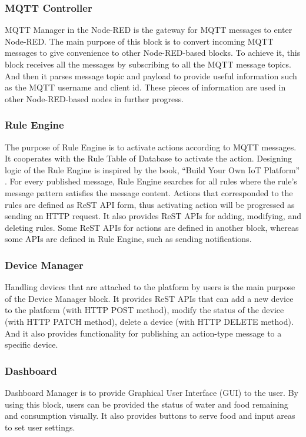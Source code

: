 \documentclass[conference]{IEEEtran}
\begin{document}
\subsubsection{MQTT Controller}
MQTT Manager in the Node-RED is the gateway for MQTT messages to enter Node-RED. The main purpose of this block is to convert incoming MQTT messages to give convenience to other Node-RED-based blocks. To achieve it, this block receives all the messages by subscribing to all the MQTT message topics. And then it parses message topic and payload to provide useful information such as the MQTT username and client id. These pieces of information are used in other Node-RED-based nodes in further progress.

\subsubsection{Rule Engine}
The purpose of Rule Engine is to activate actions according to MQTT messages. It cooperates with the Rule Table of Database to activate the action. Designing logic of the Rule Engine is inspired by the book, “Build Your Own IoT Platform” \cite{b22}. For every published message, Rule Engine searches for all rules where the rule’s message pattern satisfies the message content. Actions that corresponded to the rules are defined as ReST API form, thus activating action will be progressed as sending an HTTP request. It also provides ReST APIs for adding, modifying, and deleting rules. Some ReST APIs for actions are defined in another block, whereas some APIs are defined in Rule Engine, such as sending notifications.

\subsubsection{Device Manager}
Handling devices that are attached to the platform by users is the main purpose of the Device Manager block. It provides ReST APIs that can add a new device to the platform (with HTTP POST method), modify the status of the device (with HTTP PATCH method), delete a device (with HTTP DELETE method). And it also provides functionality for publishing an action-type message to a specific device.

\subsubsection{Dashboard}
Dashboard Manager is to provide Graphical User Interface (GUI) to the user. By using this block, users can be provided the status of water and food remaining and consumption visually. It also provides buttons to serve food and input areas to set user settings.
\end{document}
